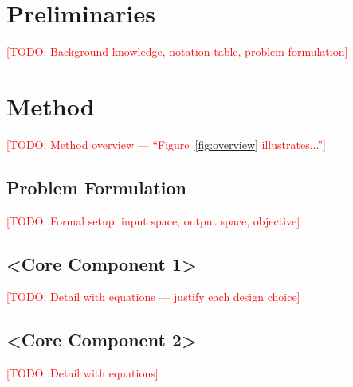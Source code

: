 \documentclass[11pt,a4paper]{article}
\newcommand{\ours}{\textsc{<MethodName>}}
\newcommand{\todo}[1]{\textcolor{red}{[TODO: #1]}}
\begin{document}
\section{Preliminaries}
\label{sec:prelim}

\todo{Background knowledge, notation table, problem formulation}


\section{Method}
\label{sec:method}

\todo{Method overview — ``Figure~\ref{fig:overview} illustrates...''}


\subsection{Problem Formulation}
\label{sec:formulation}
\todo{Formal setup: input space, output space, objective}

\subsection{<Core Component 1>}
\label{sec:comp1}
\todo{Detail with equations — justify each design choice}

\subsection{<Core Component 2>}
\label{sec:comp2}
\todo{Detail with equations}
\end{document}
